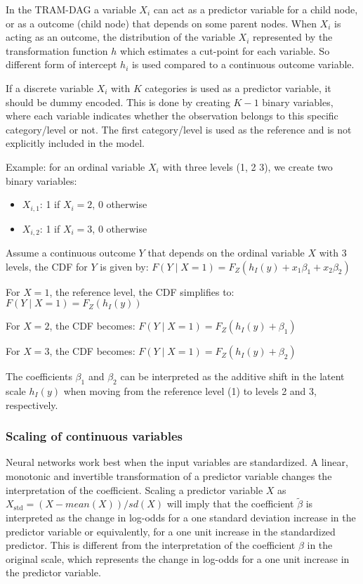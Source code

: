 In the TRAM-DAG a variable $X_i$ can act as a predictor variable for a child node, or as a outcome (child node) that depends on some parent nodes. When $X_i$ is acting as an outcome, the distribution of the variable $X_i$ represented by the transformation function $h$ which estimates a cut-point for each variable. So different form of intercept $h_i$ is used compared to a continuous outcome variable.

If a discrete variable $X_i$ with $K$ categories is used as a predictor variable, it should be dummy encoded. This is done by creating $K-1$ binary variables, where each variable indicates whether the observation belongs to this specific category/level or not. The first category/level is used as the reference and is not explicitly included in the model.

Example: for an ordinal variable $X_i$ with three levels (1, 2 3), we create two binary variables:

\begin{itemize}
  \item $X_{i,1}$: 1 if $X_i = 2$, 0 otherwise
  \item $X_{i,2}$: 1 if $X_i = 3$, 0 otherwise
\end{itemize}

Assume a continuous outcome $Y$ that depends on the ordinal variable $X$ with 3 levels, the CDF for $Y$ is given by: 
$F(Y \mid X=1) = F_Z(h_I(y) + x_1\beta_1 + x_2\beta_2)$ 

For $X=1$, the reference level, the CDF simplifies to: 
$F(Y \mid X=1) = F_Z(h_I(y))$

For $X=2$, the CDF becomes: $F(Y \mid X=1) = F_Z(h_I(y) + \beta_1)$

For $X=3$, the CDF becomes: $F(Y \mid X=1) = F_Z(h_I(y) + \beta_2)$

The coefficients $\beta_1$ and $\beta_2$ can be interpreted as the additive shift in the latent scale $h_I(y)$ when moving from the reference level (1) to levels 2 and 3, respectively.


\subsubsection{Scaling of continuous variables}

Neural networks work best when the input variables are standardized. A linear, monotonic and invertible transformation of a predictor variable changes the interpretation of the coefficient. Scaling a predictor variable $X$ as $X_{\text{std}} = (X - mean(X)) / sd(X)$ will imply that the coefficient $\tilde{\beta}$ is interpreted as the change in log-odds for a one standard deviation increase in the predictor variable or equivalently, for a one unit increase in the standardized predictor. This is different from the interpretation of the coefficient $\beta$ in the original scale, which represents the change in log-odds for a one unit increase in the predictor variable.




